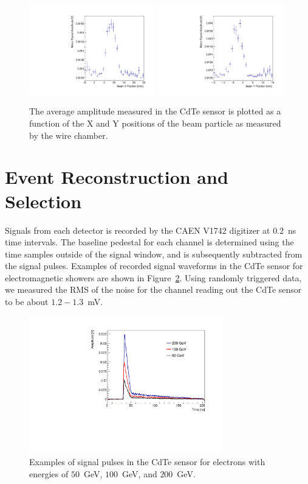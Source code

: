 \documentclass[preprint,1p]{elsarticle}
\begin{document}
\begin{figure}[htbp] 
\centering
\includegraphics[width=0.49\textwidth]{figures/SensorXProfile.pdf} 
\includegraphics[width=0.49\textwidth]{figures/SensorYProfile.pdf} 
\caption{The average amplitude measured in the CdTe sensor is plotted as a function of 
the X and Y positions of the beam particle as measured by the wire chamber.} 
\label{fig:BeamSensorPosition} 
\end{figure} 


\section{Event Reconstruction and Selection }
\label{sec:reco}

Signals from each detector is recorded by the CAEN V1742 digitizer at $0.2$~ns time intervals.
The baseline pedestal for each channel is determined using the time samples outside of
the signal window, and is subsequently subtracted from the signal pulses. Examples of recorded
signal waveforms in the CdTe sensor for electromagnetic showers are shown in Figure~\ref{fig:Pulses}.
Using randomly triggered data, we measured the RMS of the noise for the channel reading out 
the CdTe sensor to be about $1.2-1.3$~mV. 

\begin{figure}[htbp] 
\centering
\includegraphics[width=0.75\textwidth]{figures/TypicalPulses.pdf} 
\caption{Examples of signal pulses in the CdTe sensor for electrons with energies of $50$~GeV,
$100$~GeV, and $200$~GeV.} 
\label{fig:Pulses} 
\end{figure} 
\end{document}
